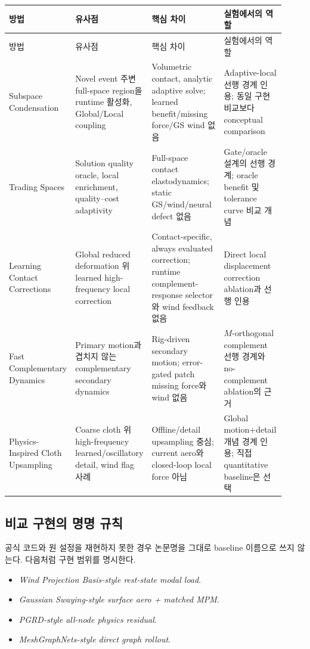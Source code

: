 \documentclass[11pt,a4paper]{article}
\begin{document}
\begin{longtable}{L{0.16\linewidth}L{0.23\linewidth}L{0.30\linewidth}L{0.23\linewidth}}
\toprule
방법 & 유사점 & 핵심 차이 & 실험에서의 역할 \\
\midrule
\endfirsthead
\toprule
방법 & 유사점 & 핵심 차이 & 실험에서의 역할 \\
\midrule
\endhead
Subspace Condensation \cite{teng2015condensation}
& Novel event 주변 full-space region을 runtime 활성화, Global/Local coupling
& Volumetric contact, analytic adaptive solve; learned benefit/missing force/GS wind 없음
& Adaptive-local 선행 경계 인용; 동일 구현 비교보다 conceptual comparison \\
\addlinespace
Trading Spaces \cite{trusty2024tradingspaces}
& Solution quality oracle, local enrichment, quality--cost adaptivity
& Full-space contact elastodynamics; static GS/wind/neural defect 없음
& Gate/oracle 설계의 선행 경계; oracle benefit 및 tolerance curve 비교 개념 \\
\addlinespace
Learning Contact Corrections \cite{romero2021contact}
& Global reduced deformation 위 learned high-frequency local correction
& Contact-specific, always evaluated correction; runtime complement-response selector와 wind feedback 없음
& Direct local displacement correction ablation과 선행 인용 \\
\addlinespace
Fast Complementary Dynamics \cite{benchekroun2023complementary}
& Primary motion과 겹치지 않는 complementary secondary dynamics
& Rig-driven secondary motion; error-gated patch missing force와 wind 없음
& \(M\)-orthogonal complement 선행 경계와 no-complement ablation의 근거 \\
\addlinespace
Physics-Inspired Cloth Upsampling \cite{kavan2011upsampling}
& Coarse cloth 위 high-frequency learned/oscillatory detail, wind flag 사례
& Offline/detail upsampling 중심; current aero와 closed-loop local force 아님
& Global motion+detail 개념 경계 인용; 직접 quantitative baseline은 선택 \\
\bottomrule
\end{longtable}

\subsection{비교 구현의 명명 규칙}

공식 코드와 원 설정을 재현하지 못한 경우 논문명을 그대로 baseline 이름으로 쓰지 않는다.
다음처럼 구현 범위를 명시한다.

\begin{itemize}[leftmargin=1.5em]
  \item \emph{Wind Projection Basis-style rest-state modal load}.
  \item \emph{Gaussian Swaying-style surface aero + matched MPM}.
  \item \emph{PGRD-style all-node physics residual}.
  \item \emph{MeshGraphNets-style direct graph rollout}.
\end{itemize}
\end{document}
